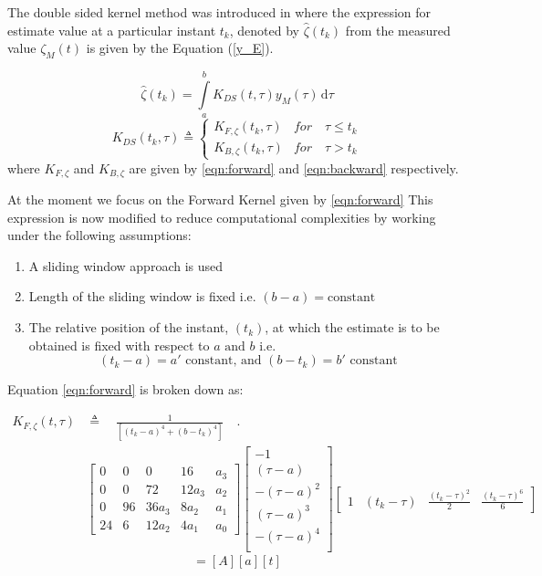 \documentclass[letterpaper%
, twoside%
, 12pt%
,memoire%
, english%
,creativecommons,hyperref%
]{thETS}
\begin{document}
The double sided kernel method was introduced in \citep{RN76} where the expression for estimate value at a particular instant $t_k$, denoted by $\hat{\zeta}(t_k)$ from the measured value $\zeta_M(t)$ is given by the Equation (\ref{y_E}). 

\begin{equation}\label{y_E}
\hat{\zeta}(t_k) = \int\limits_{a}^{b}K_{DS}(t,\tau) y_M(\tau)\, \mathrm{d}\tau
\end{equation}
\begin{equation}
K_{DS}(t_k,\tau) \triangleq \left\{
\begin{array}{lr}
K_{F,\zeta}(t_k,\tau) & for \quad \tau \le t_k\\
K_{B,\zeta}(t_k,\tau) & for \quad \tau > t_k
\end{array}
\right.
\label{K}
\end{equation}
where $K_{F,\zeta}$ and $K_{B,\zeta}$ are given by \eqref{eqn:forward} and \eqref{eqn:backward} respectively. 

At the moment we focus on the Forward Kernel given by \eqref{eqn:forward} This expression is now modified to reduce computational complexities by working under the following assumptions:
\begin{enumerate}
\item A sliding window approach is used
\item Length of the sliding window is fixed i.e. $(b-a)=\textrm{constant}$
\item The relative position of the instant, $(t_k)$,  at which the estimate is to be obtained is fixed with respect to $a\textrm{ and }b \textrm{ i.e. }$ $$ (t_k-a)= a' \textrm{ constant, and } (b-t_k)=b'\textrm{ constant}$$  
\end{enumerate}
Equation \eqref{eqn:forward} is broken down as:

\begin{align} \label{eqn:kernVec1}
K_{F,\zeta}(t,\tau) &\triangleq \quad \frac{1}{[(t_k-a)^4+(b-t_k)^4]} \quad .\nonumber\\
&\begin{bmatrix}
0  &  0  &   0   &  16    &   a_3   \\
0  &  0  &   72   & 12a_3  &   a_2  \\
0  &  96 & 36a_3 &  8a_2  &   a_1   \\
24 &  6  & 12a_2 &  4a_1   &   a_0  
\end{bmatrix}
\begin{bmatrix}
     - 1       \\
 (\tau - a)    \\
-(\tau - a)^2  \\
 (\tau - a)^3  \\
-(\tau - a)^4  \\
\end{bmatrix}
\begin{bmatrix}
1  & (t_k-\tau) & \frac{(t_k-\tau)^2}{2} & \frac{(t_k-\tau)^6}{6}
\end{bmatrix}
\end{align}
\begin{equation} \label{eqn:kernVec2}
= [A][a][t] 
\end{equation}
\end{document}
